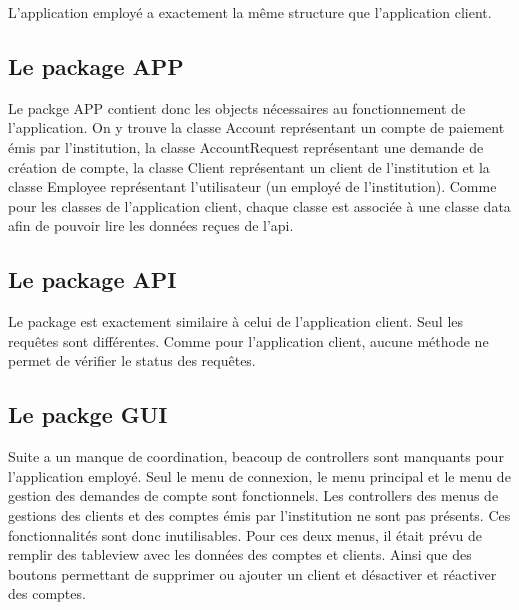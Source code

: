 \documentclass[../rapport.tex]{subfiles}
\begin{document}
L'application employé a exactement la même structure que l'application client.

\subsection{Le package APP}
Le packge APP contient donc les objects nécessaires au fonctionnement de l'application. On y trouve la classe Account représentant un compte de paiement émis par l'institution, la classe AccountRequest représentant une demande de création de compte, la classe Client représentant un client de l'institution et la classe Employee représentant l'utilisateur (un employé de l'institution).
Comme pour les classes de l'application client, chaque classe est associée à une classe data afin de pouvoir lire les données reçues de l'api.

\subsection{Le package API}
Le package est exactement similaire à celui de l'application client.
Seul les requêtes sont différentes. Comme pour l'application client, aucune méthode ne permet de vérifier le status des requêtes.

\subsection{Le packge GUI}
Suite a un manque de coordination, beacoup de controllers sont manquants pour l'application employé. Seul le menu de connexion, le menu principal et le menu de gestion des demandes de compte sont fonctionnels. Les controllers des menus de gestions des clients et des comptes émis par l'institution ne sont pas présents. Ces fonctionnalités sont donc inutilisables. Pour ces deux menus, il était prévu de remplir des tableview avec les données des comptes et clients. Ainsi que des boutons permettant de supprimer ou ajouter un client et désactiver et réactiver des comptes.

\newpage
\end{document}

